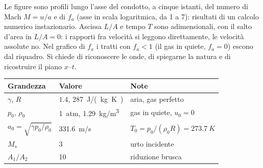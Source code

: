 \documentclass[11pt,a4paper]{article}
\newcommand{\fa}{f_a}
\begin{document}
Le figure sono profili lungo l'asse del condotto, a cinque istanti, del numero di Mach $M=u/a$ e di $\fa$ (asse
in scala logaritmica, da 1 a 7): risultati di un calcolo numerico instazionario. Ascissa $L/A$ e tempo $T$ sono
adimensionali, con il salto d'area in $L/A=0$: i rapporti fra velocità si leggono direttamente, le
velocità assolute no. Nel grafico di $\fa$ i tratti con $\fa<1$ (il gas in quiete, $\fa=0$) escono dal
riquadro. Si chiede di riconoscere le onde, di spiegarne la natura e di ricostruire il piano $x$--$t$.

\begin{table}[H]
  \centering
  \begin{tabular}{lll}
    \toprule
    Grandezza & Valore & Note \\
    \midrule
    $\gamma$, $R$ & $\num{1.4}$, \SI{287}{J/(kg.K)} & aria, gas perfetto \\
    $p_0$, $\rho_0$ & \SI{1}{atm}, \SI{1.29}{kg/m^3} & gas in quiete, $u_0=0$ \\
    $a_0=\sqrt{\gamma p_0/\rho_0}$ & \SI{331.6}{m/s} & $T_0=p_0/(\rho_0R)=\SI{273.7}{K}$ \\
    $M_s$ & 3 & urto incidente \\
    $A_1/A_2$ & 10 & riduzione brusca \\
    \bottomrule
  \end{tabular}
\end{table}

\end{document}

